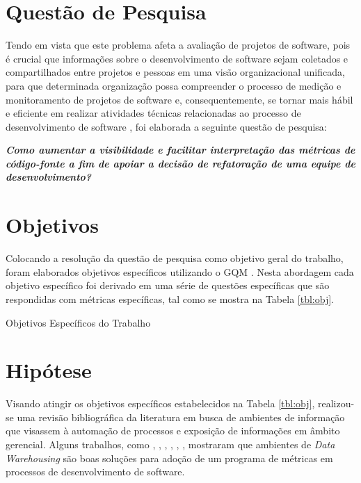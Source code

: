 
\section{Questão de Pesquisa}

Tendo em vista que este problema afeta a avaliação de projetos de software, pois é crucial que informações sobre o desenvolvimento de software sejam coletados e compartilhados entre projetos e pessoas em uma visão organizacional unificada, para que determinada organização possa compreender o processo de medição e monitoramento de projetos de software e, consequentemente, se tornar mais hábil e eficiente em realizar atividades técnicas relacionadas ao processo de desenvolvimento de software \cite{Chulani2003}, foi elaborada a seguinte questão de pesquisa:

\textit{\textbf{Como aumentar a
visibilidade e facilitar interpretação das 
métricas de código-fonte
a fim de apoiar a decisão de refatoração
de uma equipe de desenvolvimento?}}


\section{Objetivos}

Colocando a resolução da questão de pesquisa como objetivo geral do trabalho, foram elaborados objetivos específicos utilizando o GQM \cite{Basili96b}. Nesta abordagem cada objetivo específico foi derivado em uma série de questões específicas que são respondidas com métricas específicas, tal como se mostra na Tabela \ref{tbl:obj}. 

\begin{table}
\centering

\caption{Objetivos Específicos do Trabalho}
\label{tbl:obj} 
\end{table}
\FloatBarrier

\section{Hipótese}

Visando atingir os objetivos específicos estabelecidos na Tabela \ref{tbl:obj}, realizou-se uma revisão bibliográfica da literatura em busca de ambientes de informação que visassem à automação de processos e exposição de informações em âmbito gerencial.
Alguns trabalhos, como , , , , , , mostraram que ambientes de \textit{Data Warehousing} são boas soluções para adoção de um programa de métricas em processos de desenvolvimento de software.

